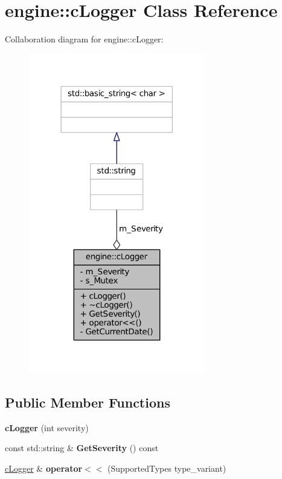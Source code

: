 \hypertarget{classengine_1_1cLogger}{\section{engine\-:\-:c\-Logger \-Class \-Reference}
\label{classengine_1_1cLogger}
}


\-Collaboration diagram for engine\-:\-:c\-Logger\-:
\nopagebreak
\begin{figure}[H]
\begin{center}
\leavevmode
\includegraphics[width=218pt]{classengine_1_1cLogger__coll__graph}
\end{center}
\end{figure}
\subsection*{\-Public \-Member \-Functions}
\begin{DoxyCompactItemize}
\item 
\hypertarget{classengine_1_1cLogger_a127edc3f43400830cc8b46a1ccd5d183}{{\bfseries c\-Logger} (int severity)}\label{classengine_1_1cLogger_a127edc3f43400830cc8b46a1ccd5d183}

\item 
\hypertarget{classengine_1_1cLogger_a1473c1a79b0e677476da12f457fd8ff6}{const std\-::string \& {\bfseries \-Get\-Severity} () const }\label{classengine_1_1cLogger_a1473c1a79b0e677476da12f457fd8ff6}

\item 
\hypertarget{classengine_1_1cLogger_afaad3dca17bb3dd399d379e2ddd114b2}{\hyperlink{classengine_1_1cLogger}{c\-Logger} \& {\bfseries operator$<$$<$} (\-Supported\-Types type\-\_\-variant)}\label{classengine_1_1cLogger_afaad3dca17bb3dd399d379e2ddd114b2}

\end{DoxyCompactItemize}

